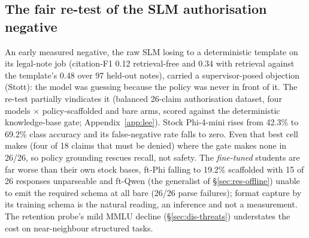 \subsection{The fair re-test of the SLM authorisation negative}\label{sec:res-lee}
An early measured negative, the raw SLM losing to a deterministic template
on its legal-note job (citation-F1 0.12 retrieval-free and 0.34 with
retrieval against the template's 0.48 over 97 held-out notes), carried a
supervisor-posed objection (Stott): the model was guessing because the
policy was never in front of it. The re-test partially vindicates it
(balanced 26-claim authorisation dataset, four models $\times$
policy-scaffolded and bare arms, scored against the deterministic
knowledge-base gate; Appendix~\ref{app:lee}). Stock Phi-4-mini rises
from 42.3\% to 69.2\% class accuracy and its false-negative rate falls to
zero. Even that best cell makes 
(four of 18 claims that must be denied) where the gate makes none in
26/26, so policy grounding rescues recall, not safety. The \emph{fine-tuned}
students are far worse than their own stock bases, ft-Phi falling to
19.2\% scaffolded with 15 of 26 responses unparseable and ft-Qwen (the
generalist of \S\ref{sec:res-offline}) unable to emit the required schema
at all bare (26/26 parse failures); format capture by its training schema
is the natural reading, an inference and not a measurement. The retention
probe's mild MMLU decline (\S\ref{sec:dis-threats}) understates the cost
on near-neighbour structured tasks.
